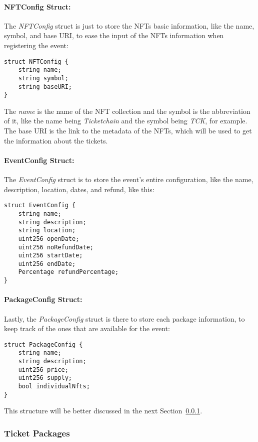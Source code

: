 \paragraph{NFTConfig Struct:} The \textit{NFTConfig} struct is just to store the NFTs basic information, like
the name, symbol, and base URI, to ease the input of the NFTs information when
registering the event:
\begin{lstlisting}[caption=NFTConfig struct]
struct NFTConfig {
	string name;
	string symbol;
	string baseURI;
}
\end{lstlisting}
The \textit{name} is the name of the NFT collection and the symbol is the
abbreviation of it, like the name being \textit{Ticketchain} and the symbol
being \textit{TCK}, for example. The base URI is the link to the metadata of
the NFTs, which will be used to get the information about the tickets.

\paragraph{EventConfig Struct:} The \textit{EventConfig} struct is to store the event's entire configuration,
like the name, description, location, dates, and refund, like this:
\begin{lstlisting}[caption=EventConfig struct]
struct EventConfig {
	string name;
	string description;
	string location;
	uint256 openDate;
	uint256 noRefundDate;
	uint256 startDate;
	uint256 endDate;
	Percentage refundPercentage;
}
\end{lstlisting}

\paragraph{PackageConfig Struct:} Lastly, the \textit{PackageConfig} struct is there to store each package
information, to keep track of the ones that are available for the event:
\begin{lstlisting}[caption=PackageConfig struct]
struct PackageConfig {
	string name;
	string description;
	uint256 price;
	uint256 supply;
	bool individualNfts;
}
\end{lstlisting}
This structure will be better discussed in the next
Section~\ref{subsubsec:ticket_packages}.

\subsubsection{Ticket Packages}\label{subsubsec:ticket_packages}

